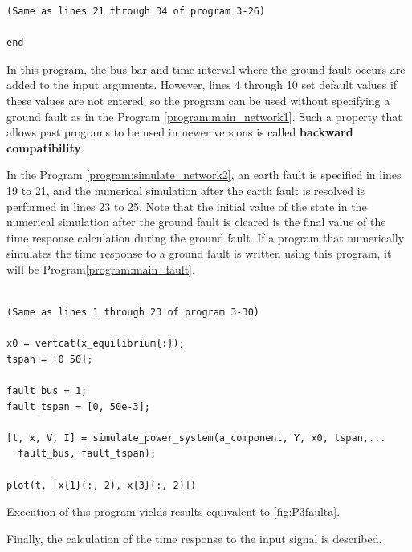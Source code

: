 \documentclass[graybox, envcountchap]{svmult}
\begin{document}
\begin{example}
\begin{PROGRAMA}[count,title={simulate\_power\_system.m}]
\begin{verbatim}
(Same as lines 21 through 34 of program 3-26)

end
\end{verbatim}
\end{PROGRAMA}

In this program, the bus bar and time interval where the ground fault occurs are added to the input arguments.
However, lines 4 through 10 set default values if these values are not entered, so the program can be used without specifying a ground fault as in the Program \nobreak\ref{program:main_network1}.
Such a property that allows past programs to be used in newer versions is called \textbf{backward compatibility}.

In the Program \nobreak\ref{program:simulate_network2}, an earth fault is specified in lines 19 to 21, and the numerical simulation after the earth fault is resolved is performed in lines 23 to 25.
Note that the initial value of the state in the numerical simulation after the ground fault is cleared is the final value of the time response calculation during the ground fault.
If a program that numerically simulates the time response to a ground fault is written using this program, it will be Program\nobreak\ref{program:main_fault}.

\smallskip
\begin{PROGRAMA}[count,title={main\_simulation\_3bus\_fault.m}]\label{program:main_fault}
\begin{verbatim}

(Same as lines 1 through 23 of program 3-30)

x0 = vertcat(x_equilibrium{:});
tspan = [0 50];

fault_bus = 1;
fault_tspan = [0, 50e-3];

[t, x, V, I] = simulate_power_system(a_component, Y, x0, tspan,...
  fault_bus, fault_tspan);

plot(t, [x{1}(:, 2), x{3}(:, 2)])
\end{verbatim}
\end{PROGRAMA}

Execution of this program yields results equivalent to \ref{fig:P3faulta}.
\end{example}

Finally, the calculation of the time response to the input signal is described.
\end{document}

